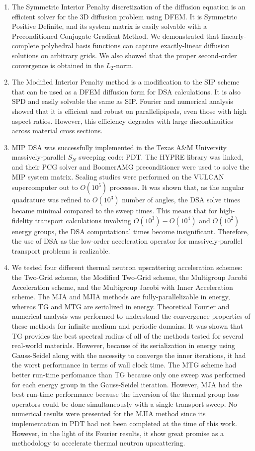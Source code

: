 \begin{enumerate}
\item The Symmetric Interior Penalty discretization of the diffusion equation is an efficient solver for the 3D diffusion problem using DFEM. It is Symmetric Positive Definite, and its system matrix is easily solvable with a Preconditioned Conjugate Gradient Method. We demonstrated that linearly-complete polyhedral basis functions can capture exactly-linear diffusion solutions on arbitrary grids. We also showed that the proper second-order convergence is obtained in the $L_2$-norm.
\item The Modified Interior Penalty method is a modification to the SIP scheme that can be used as a DFEM diffusion form for DSA calculations. It is also SPD and easily solvable the same as SIP. Fourier and numerical analysis showed that it is efficient and robust on parallelipipeds, even those with high aspect ratios. However, this efficiency degrades with large discontinuities across material cross sections.
\item MIP DSA was successfully implemented in the Texas A\&M University massively-parallel $S_N$ sweeping code: PDT. The HYPRE library was linked, and their PCG solver and BoomerAMG preconditioner were used to solve the MIP system matrix. Scaling studies were performed on the VULCAN supercomputer out to $O(10^5)$ processes. It was shown that, as the angular quadrature was refined to $O(10^3)$ number of angles, the DSA solve times became minimal compared to the sweep times. This means that for high-fidelity transport calculations involving $O(10^3) - O(10^4)$ and $O(10^2)$ energy groups, the DSA computational times become insignificant. Therefore, the use of DSA as the low-order acceleration operator for massively-parallel transport problems is realizable.
\item We tested four different thermal neutron upscattering acceleration schemes: the Two-Grid scheme, the Modified Two-Grid scheme, the Multigroup Jacobi Acceleration scheme, and the Multigroup Jacobi with Inner Acceleration scheme. The MJA and MJIA methods are fully-parallelizable in energy, whereas TG and MTG are serialized in energy. Theoretical Fourier and numerical analysis was performed to understand the convergence properties of these methods for infinite medium and periodic domains. It was shown that TG provides the best spectral radius of all of the methods tested for several real-world materials. However, because of its serialization in energy using Gauss-Seidel along with the necessity to converge the inner iterations, it had the worst performance in terms of wall clock time. The MTG scheme had better run-time perfomance than TG because only one sweep was performed for each energy group in the Gauss-Seidel iteration. However, MJA had the best run-time performance because the inversion of the thermal group loss operators could be done simultaneously with a single transport sweep. No numerical results were presented for the MJIA method since its implementation in PDT had not been completed at the time of this work. However, in the light of its Fourier results, it show great promise as a methodology to accelerate thermal neutron upscattering.
\end{enumerate}

